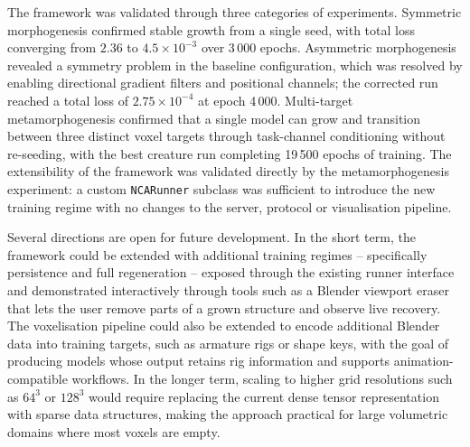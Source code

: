 The framework was validated through three categories of experiments. Symmetric
morphogenesis confirmed stable growth from a single seed, with total loss
converging from $2.36$ to $4.5 \times 10^{-3}$ over 3\,000 epochs.
Asymmetric morphogenesis revealed a symmetry problem in the
baseline configuration, which was resolved by enabling directional gradient
filters and positional channels; the corrected run reached a total loss of
$2.75 \times 10^{-4}$ at epoch 4\,000. Multi-target metamorphogenesis
confirmed that a single model can grow and transition between three distinct
voxel targets through task-channel conditioning without re-seeding, with the
best creature run completing 19\,500 epochs of training. The extensibility
of the framework was validated directly by the metamorphogenesis experiment:
a custom \texttt{NCARunner} subclass was sufficient to introduce the new
training regime with no changes to the server, protocol or visualisation
pipeline.

Several directions are open for future development. In the short term, the
framework could be extended with additional training regimes -- specifically
persistence and full regeneration -- exposed through the existing runner
interface and demonstrated interactively through tools such as a Blender
viewport eraser that lets the user remove parts of a grown structure and
observe live recovery. The voxelisation pipeline could also be extended to
encode additional Blender data into training targets, such as armature rigs
or shape keys, with the goal of producing models whose output retains rig
information and supports animation-compatible workflows. In the longer term,
scaling to higher grid resolutions such as $64^3$ or $128^3$ would require
replacing the current dense tensor representation with sparse data
structures, making the approach practical for large volumetric domains where
most voxels are empty.


% 
